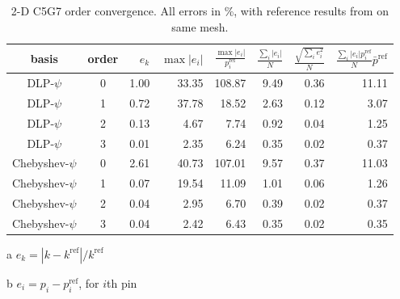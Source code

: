 \begin{table}[ht] 
 
\begin{center} 

 \caption{2-D C5G7 order convergence.  All errors in \%, with 
          reference results from \Detran on same mesh.} 
 \label{tbl:c5g7_order_convergence} 

  \begin{threeparttable}
 \begin{tabular}{ccrrrrrr} 
 \toprule 
 basis & order & $e_k$\tnote{a}   & $\max |e_i|$\tnote{b}  & $ \frac{\max |e_i|}{p^{\text{ref}}_i} $  
   & $\frac{\sum_i |e_i|}{ N}$   &  $\frac{\sqrt{\sum_{i} e_{i}^2}}{N}$   
     & $ \frac{\sum_i |e_i|p^{\text{ref}}_i}{N} \bar{p}^{\text{ref}}$    \\
 \midrule 
DLP-$\psi$ &    0  &     1.00   &    33.35   &   108.87   &     9.49   &     0.36   &    11.11   \\
DLP-$\psi$  &    1  &     0.72   &    37.78   &    18.52   &     2.63   &     0.12   &     3.07   \\
DLP-$\psi$  &    2  &     0.13   &     4.67   &     7.74   &     0.92   &     0.04   &     1.25   \\
DLP-$\psi$  &    3  &     0.01   &     2.35   &     6.24   &     0.35   &     0.02   &     0.37   \\
 \midrule 
Chebyshev-$\psi$ &    0  &     2.61   &    40.73   &   107.01   &     9.57   &     0.37   &    11.03   \\
Chebyshev-$\psi$ &    1  &     0.07   &    19.54   &    11.09   &     1.01   &     0.06   &     1.26   \\
Chebyshev-$\psi$ &    2  &     0.04   &     2.95   &     6.70   &     0.39   &     0.02   &     0.37   \\
Chebyshev-$\psi$ &    3  &     0.04   &     2.42   &     6.43   &     0.35   &     0.02   &     0.35   \\
 \bottomrule 
 \end{tabular} 
 
 {\footnotesize
 \begin{tablenotes}
   \item[a] $e_k = |k-k^{\text{ref}}|/k^{\text{ref}}$  
   \item[b] $e_i = p_i - p^{\text{ref}}_i$, for $i$th pin
 \end{tablenotes}
 }
 
 \end{threeparttable}
 
 \end{center} 

\end{table} 

